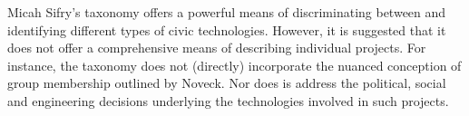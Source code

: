 Micah Sifry’s taxonomy offers a powerful means of discriminating between and identifying different types of civic technologies.
However, it is suggested that it does not offer a comprehensive means of describing individual projects.
For instance, the taxonomy does not (directly) incorporate the nuanced conception of group membership outlined by Noveck.
Nor does is address the political, social and engineering decisions underlying the technologies involved in such projects.